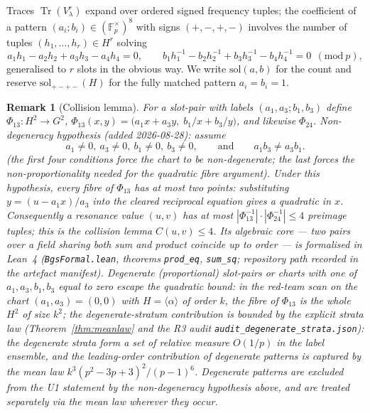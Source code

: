 \documentclass[11pt]{article}
\newtheorem{remark}[theorem]{Remark}
\begin{document}
Traces $\operatorname{Tr}(V_\lambda^r)$ expand over ordered signed
frequency tuples; the coefficient of a pattern
$(a_i;b_i)\in(\mathbb F_p^\times)^{8}$ with signs
$(+,-,+,-)$ involves the number of tuples
$(h_1,\dots,h_r)\in H^r$ solving
\begin{equation}\label{eq:gen}
a_1h_1-a_2h_2+a_3h_3-a_4h_4=0,\qquad
b_1h_1^{-1}-b_2h_2^{-1}+b_3h_3^{-1}-b_4h_4^{-1}=0
\ \ (\mathrm{mod}\ p),
\end{equation}
generalised to $r$ slots in the obvious way. We write
$\mathrm{sol}(a,b)$ for the count and reserve
$\mathrm{sol}_{+-+-}(H)$ for the fully matched pattern
$a_i=b_i=1$.

\begin{remark}[Collision lemma]\label{rem:collision}
For a slot-pair with labels $(a_1,a_3;b_1,b_3)$ define
$\Phi_{13}:H^2\to G^2$,
$\Phi_{13}(x,y)=\bigl(a_1x+a_3y,\;b_1/x+b_3/y\bigr)$, and
likewise $\Phi_{24}$. \emph{Non-degeneracy hypothesis
(added 2026-08-28):} assume
\[
a_1\ne 0,\ a_3\ne 0,\ b_1\ne 0,\ b_3\ne 0,
\qquad\text{and}\qquad a_1b_3\ne a_3b_1.
\]
(the first four conditions force the chart to be
non-degenerate; the last forces the
non-proportionality needed for the quadratic fibre
argument). Under this hypothesis, every fibre of
$\Phi_{13}$ has at most two points: substituting
$y=(u-a_1x)/a_3$ into the cleared reciprocal equation
gives a quadratic
in $x$. Consequently a resonance value $(u,v)$ has at
most
$|\Phi_{13}^{-1}|\cdot|\Phi_{24}^{-1}|\le4$ preimage
tuples; this is
the \emph{collision lemma} $C(u,v)\le4$. Its algebraic
core --- two
pairs over a field sharing both sum and product coincide
up to order
--- is formalised in Lean~4
(\texttt{BgsFormal.lean}, theorems \texttt{prod\_eq},
\texttt{sum\_sq}; repository path recorded in the
artefact manifest).
Degenerate (proportional) slot-pairs
or charts with one of $a_1,a_3,b_1,b_3$ equal to zero
\emph{escape} the quadratic bound: in the red-team
scan on the chart $(a_1,a_3)=(0,0)$ with $H=\langle
\alpha\rangle$ of order $k$, the fibre of $\Phi_{13}$ is
the whole $H^2$ of size $k^2$; the degenerate-stratum
contribution is bounded by
the explicit \emph{strata} law
(Theorem~\ref{thm:meanlaw} and the R3 audit
\texttt{audit\_degenerate\_strata.json}):
the degenerate strata form a set of relative measure
$O(1/p)$ in the label ensemble, and the leading-order
contribution of degenerate patterns is captured by the
mean law $k^3(p^2-3p+3)^2/(p-1)^6$. Degenerate
patterns are excluded from the U1 statement by the
non-degeneracy hypothesis above, and are treated
separately via the mean law wherever they occur.
\end{remark}
\end{document}
